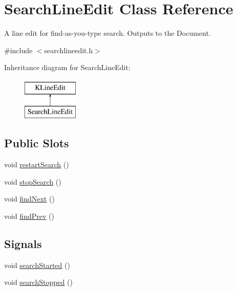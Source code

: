 \hypertarget{classSearchLineEdit}{\section{Search\+Line\+Edit Class Reference}
\label{classSearchLineEdit}
}


A line edit for find-\/as-\/you-\/type search. Outputs to the Document.  




{\ttfamily \#include $<$searchlineedit.\+h$>$}

Inheritance diagram for Search\+Line\+Edit\+:\begin{figure}[H]
\begin{center}
\leavevmode
\includegraphics[height=2.000000cm]{classSearchLineEdit}
\end{center}
\end{figure}
\subsection*{Public Slots}
\begin{DoxyCompactItemize}
\item 
void \hyperlink{classSearchLineEdit_a930b33651d8f572a4ceaa64ed89cc17a}{restart\+Search} ()
\item 
void \hyperlink{classSearchLineEdit_a954f916d96d3041a4629898ba26ba9b0}{stop\+Search} ()
\item 
void \hyperlink{classSearchLineEdit_af4a373b7d975d60c7924467ec1abdc19}{find\+Next} ()
\item 
void \hyperlink{classSearchLineEdit_a13945982eef084b783d57b63ac0a7294}{find\+Prev} ()
\end{DoxyCompactItemize}
\subsection*{Signals}
\begin{DoxyCompactItemize}
\item 
void \hyperlink{classSearchLineEdit_a8f68968f1b5a8e3fc274752585818d7c}{search\+Started} ()
\item 
void \hyperlink{classSearchLineEdit_aa26570c25477b05755a89bf2a0df0999}{search\+Stopped} ()
\end{DoxyCompactItemize}
